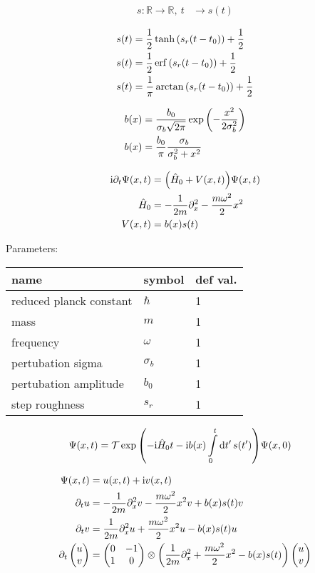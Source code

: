 \documentclass[a4paper,10pt]{article}
\newcommand{\mi}{\mathrm{i}}
\newcommand{\intl}{\int\limits}
\begin{document}
\begin{align}
    s:\mathbb{R}\to\mathbb{R},~
    t
    &\to
    s(t)
\end{align}

\begin{align}
	s(t)
	&=
	\frac{1}{2}\tanh\pqty{s_r(t-t_0)}
	+\frac{1}{2}
\\
	s(t)
	&=
	\frac{1}{2}\erf\pqty{s_r(t-t_0)}
	+\frac{1}{2}
\\
	s(t)
	&=
	\frac{1}{\pi}\arctan\pqty{s_r(t-t_0)}
	+\frac{1}{2}
\end{align}

\begin{align}
	b(x)
	&=
	\frac{b_0}{\sigma_b\sqrt{2\pi}}
	\exp\pqty{-\frac{x^2}{2\sigma_b^2}}
\\
	b(x)
	&=
	\frac{b_0}{\pi}
	\frac{\sigma_b}{\sigma_b^2+x^2}
\end{align}

\begin{align}
    \mi
    \partial_t
    \Psi
    (x,t)
    &=
    \pqty{
    		\hat{H}_0
        +
        V(x,t)
    }
    \Psi
    (x,t)
\\
	\hat{H}_0
	&=
    -\frac{1}{2m}
    \partial_x^2
    -
    \frac{m\omega^2}{2}
    x^2
\\
    V(x,t)
    &=
    b(x)
    s(t)
\end{align}


Parameters:

\begin{tabular}{lll}
name&symbol&def val.\\
\hline
reduced planck constant&$\hbar$&1\\
mass&$m$&1\\
frequency&$\omega$&1\\
pertubation sigma&$\sigma_b$&1\\
pertubation amplitude&$b_0$&1\\
step roughness&$s_r$&1\
\end{tabular}





\begin{align}
    \Psi
    (x,t)
    &=
    \mathcal{T}
    \exp\pqty{
    		-
    		\mi
    		\hat{H}_0
    		t
    		-
		\mi b(x)
		\intl_0^t
		\dd{t^\prime}
		s(t^\prime)    
    }
    \Psi
    (x,0)
\end{align}



\begin{align}
	\Psi
	(x,t)
	&=
	u(x,t)
	+
	\mi v(x,t)
\\
	\partial_t u
	&=
	-
	\frac{1}{2m}
	\partial_x^2
	v
	-
	\frac{m\omega^2}{2}
	x^2
	v
	+
	b(x)
	s(t)
	v
\\
	\partial_t v
	&=
	\frac{1}{2m}
	\partial_x^2
	u
	+
	\frac{m\omega^2}{2}
	x^2
	u
	-
	b(x)
	s(t)
	u
\\
	\partial_t
	\pmqty{u\\v}
	&=
	\pmqty{0&-1\\1&0}	
	\otimes	
	\pqty{
	\frac{1}{2m}
	\partial_x^2
	+
	\frac{m\omega^2}{2}
	x^2
	-
	b(x)
	s(t)
	}
	\pmqty{u\\v}
\end{align}
\end{document}
